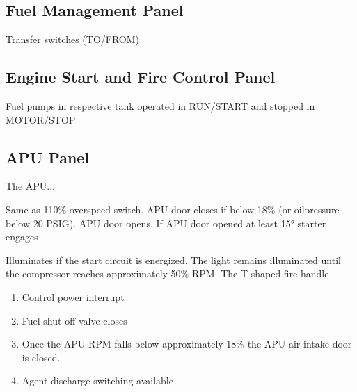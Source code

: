 \subsection{Fuel Management Panel}

Transfer switches (TO/FROM)

\subsection{Engine Start and Fire Control Panel}
\label{sec:eng-panel}

\begin{enumerate}
    \begin{itemize}
    \end{itemize}
    Fuel pumps in respective tank operated in RUN/START and stopped in MOTOR/STOP
\end{enumerate}

\subsection{APU Panel}
\label{sec:apu-panel}

The \gls{APU}...

\begin{enumerate}
    \begin{itemize}
       Same as 110\% overspeed switch. APU door closes if below 18\% (or oilpressure below 20 PSIG).
       APU door opens.
       If APU door opened at least 15° starter engages
    \end{itemize}
   Illuminates if the start circuit is energized. The light remains illuminated until the compressor reaches approximately 50\% \gls{RPM}.
   The T-shaped fire handle
    \begin{enumerate}
      \item Control power interrupt
      \item Fuel shut-off valve closes
      \item Once the APU \gls{RPM} falls below approximately 18\% the APU air intake door is closed.
      \item Agent discharge switching available
    \end{enumerate}
\end{enumerate}

